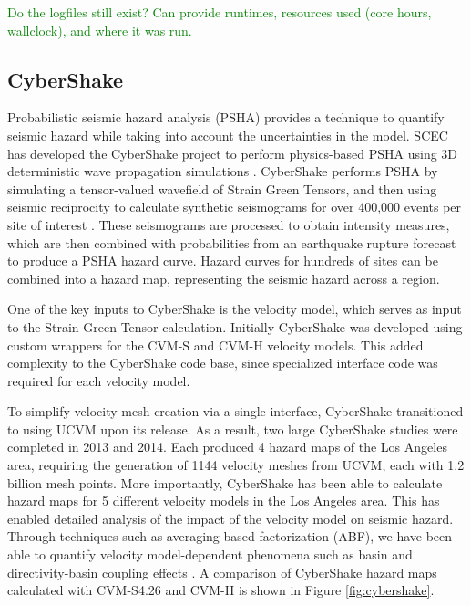 \textcolor{green}{Do the logfiles still exist? Can provide runtimes, resources used (core hours, wallclock), and where it was run.}



\subsection{CyberShake}

Probabilistic seismic hazard analysis (PSHA) provides a technique to quantify seismic hazard while taking into account the uncertainties in the model.  SCEC has developed the CyberShake project to perform physics-based PSHA using 3D deterministic wave propagation simulations \citep{Graves_2011_PAG}.  CyberShake performs PSHA by simulating a tensor-valued wavefield of Strain Green Tensors, and then using seismic reciprocity to calculate synthetic seismograms for over 400,000 events per site of interest \citep{Zhao_2006_BSSA}.  These seismograms are processed to obtain intensity measures, which are then combined with probabilities from an earthquake rupture forecast to produce a PSHA hazard curve.  Hazard curves for hundreds of sites can be combined into a hazard map, representing the seismic hazard across a region.

One of the key inputs to CyberShake is the velocity model, which serves as input to the Strain Green Tensor calculation.  Initially CyberShake was developed using custom wrappers for the CVM-S and CVM-H velocity models.  This added complexity to the CyberShake code base, since specialized interface code was required for each velocity model.

To simplify velocity mesh creation via a single interface, CyberShake transitioned to using UCVM upon its release. As a result, two large CyberShake studies were completed in 2013 \citep{Callaghan_2013_Proc} and 2014.  Each produced 4 hazard maps of the Los Angeles area, requiring the generation of 1144 velocity meshes from UCVM, each with 1.2 billion mesh points.  More importantly, CyberShake has been able to calculate hazard maps for 5 different velocity models in the Los Angeles area.  This has enabled detailed analysis of the impact of the velocity model on seismic hazard.  Through techniques such as averaging-based factorization (ABF), we have been able to quantify velocity model-dependent phenomena such as basin and directivity-basin coupling effects \citep{Wang_2014_BSSA}.  A comparison of CyberShake hazard maps calculated with CVM-S4.26 and CVM-H is shown in Figure \ref{fig:cybershake}.


